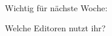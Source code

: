 \begin{frame}
  \begin{center}
    Wichtig für nächste Woche:

    Welche Editoren nutzt ihr?

  \end{center}
\end{frame}


